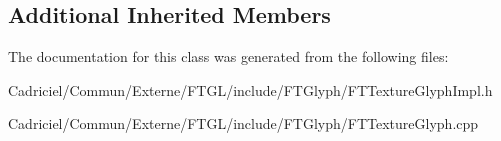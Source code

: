 \subsection*{Additional Inherited Members}


The documentation for this class was generated from the following files\+:\begin{DoxyCompactItemize}
\item 
Cadriciel/\+Commun/\+Externe/\+F\+T\+G\+L/include/\+F\+T\+Glyph/F\+T\+Texture\+Glyph\+Impl.\+h\item 
Cadriciel/\+Commun/\+Externe/\+F\+T\+G\+L/include/\+F\+T\+Glyph/F\+T\+Texture\+Glyph.\+cpp\end{DoxyCompactItemize}
